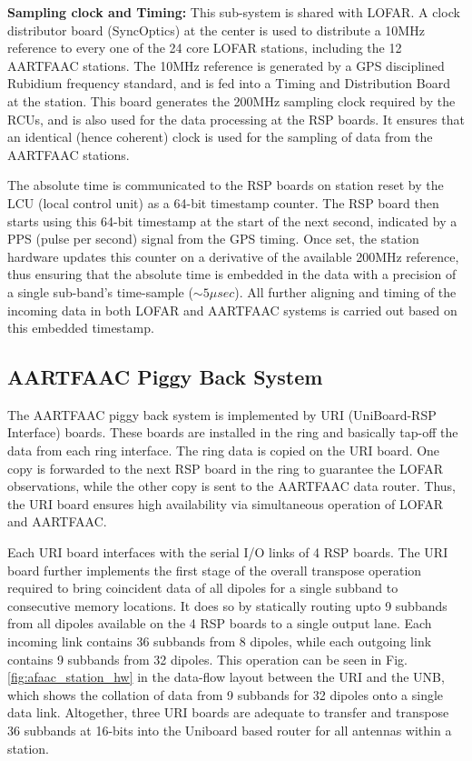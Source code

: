 \documentclass{ws-jai}
\begin{document}
\noindent \textbf  {Sampling clock and  Timing:} This sub-system is  shared with
LOFAR.  A  clock  distributor  board  (SyncOptics) at  the  center  is  used  to
distribute  a 10MHz  reference  to every  one  of the  24  core LOFAR  stations,
including the 12  AARTFAAC stations.  The 10MHz reference is  generated by a GPS
disciplined  Rubidium  frequency  standard,  and   is  fed  into  a  Timing  and
Distribution Board  at the  station.  This board  generates the  200MHz sampling
clock required by the RCUs, and is also  used for the data processing at the RSP
boards. It  ensures that  an identical  (hence coherent) clock  is used  for the
sampling of data from the AARTFAAC stations.

The absolute time is communicated to the  RSP boards on station reset by the LCU
(local control  unit) as a 64-bit  timestamp counter. The RSP  board then starts
using this 64-bit timestamp at the start  of the next second, indicated by a PPS
(pulse per second)  signal from the GPS timing.  Once  set, the station hardware
updates this  counter on a  derivative of  the available 200MHz  reference, thus
ensuring that the  absolute time is embedded  in the data with a  precision of a
single sub-band's time-sample ($\sim5\mu sec$).  All further aligning and timing
of the incoming data in both LOFAR  and AARTFAAC systems is carried out based on
this embedded timestamp.

\subsection {AARTFAAC Piggy Back System}
The AARTFAAC  piggy back system  is implemented by URI  (UniBoard-RSP Interface)
boards. These  boards are installed in  the ring and basically  tap-off the data
from each ring interface. The ring data is  copied on the URI board. One copy is
forwarded to the next RSP board in the ring to guarantee the LOFAR observations,
while the other  copy is sent to  the AARTFAAC data router. Thus,  the URI board
ensures high availability via simultaneous operation of LOFAR and AARTFAAC.

Each URI board  interfaces with the serial  I/O links of 4 RSP  boards.  The URI
board  further implements  the first  stage of  the overall  transpose operation
required  to bring  coincident  data of  all  dipoles for  a  single subband  to
consecutive memory locations.  It does so  by statically routing upto 9 subbands
from all  dipoles available on the  4 RSP boards  to a single output  lane. Each
incoming link  contains 36  subbands from  8 dipoles,  while each  outgoing link
contains  9  subbands   from  32  dipoles.   This  operation  can   be  seen  in
Fig. \ref{fig:afaac_station_hw} in the data-flow  layout between the URI and the
UNB, which  shows the collation of  data from 9  subbands for 32 dipoles  onto a
single data  link.  Altogether, three  URI boards  are adequate to  transfer and
transpose 36 subbands at 16-bits into the Uniboard based router for all antennas
within a station.\\
\end{document}
